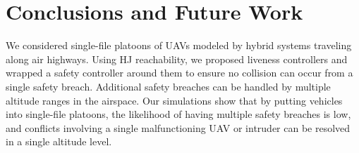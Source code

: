\section{Conclusions and Future Work}
We considered single-file platoons of UAVs modeled by hybrid systems traveling along air highways. Using HJ reachability, we proposed liveness controllers and wrapped a safety controller around them to ensure no collision can occur from a single safety breach. Additional safety breaches can be handled by multiple altitude ranges in the airspace. Our simulations show that by putting vehicles into single-file platoons, the likelihood of having multiple safety breaches is low, and conflicts involving a single malfunctioning UAV or intruder can be resolved in a single altitude level.
